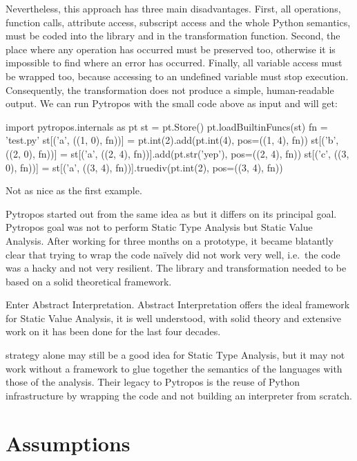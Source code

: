 Nevertheless, this approach has three main disadvantages. First, all
operations, function calls, attribute access, subscript access and the
whole Python semantics, must be coded into the library and in the
transformation function. Second, the place where any operation has
occurred must be preserved too, otherwise it is impossible to find where
an error has occurred. Finally, all variable access must be wrapped too,
because accessing to an undefined variable must stop execution.
Consequently, the transformation does not produce a simple,
human-readable output. We can run Pytropos with the small code above as
input and will get:

\begin{pythoncode}
import pytropos.internals as pt
st = pt.Store()
pt.loadBuiltinFuncs(st)
fn = 'test.py'
st[('a', ((1, 0), fn))] = pt.int(2).add(pt.int(4), pos=((1, 4), fn))
st[('b', ((2, 0), fn))] = st[('a', ((2, 4), fn))].add(pt.str('yep'), pos=((2, 4), fn))
st[('c', ((3, 0), fn))] = st[('a', ((3, 4), fn))].truediv(pt.int(2), pos=((3, 4), fn))
\end{pythoncode}

Not as nice as the first example.

Pytropos started out from the same idea as \textcite{ortin_towards_2015}
but it differs on its principal goal. Pytropos goal was not to perform
Static Type Analysis but Static Value Analysis. After working for three
months on a prototype, it became blatantly clear that trying to wrap the
code naïvely did not work very well, i.e.~the code was a hacky and not
very resilient. The library and transformation needed to be based on a
solid theoretical framework.

Enter Abstract Interpretation. Abstract Interpretation offers the ideal
framework for Static Value Analysis, it is well understood, with solid
theory and extensive work on it has been done for the last four decades.

\textcite{ortin_towards_2015} strategy alone may still be a good idea
for Static Type Analysis, but it may not work without a framework to
glue together the semantics of the languages with those of the analysis.
Their legacy to Pytropos is the reuse of Python infrastructure by
wrapping the code and not building an interpreter from scratch.

\section{Assumptions}\label{assumptions}

